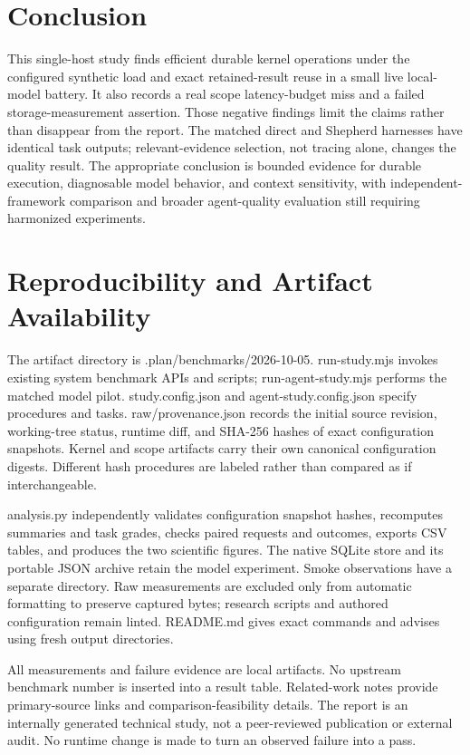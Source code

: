 \documentclass[11pt,a4paper]{article}
\begin{document}
\section{Conclusion}

This single-host study finds efficient durable kernel operations under the configured synthetic load and exact retained-result reuse in a small live local-model battery. It also records a real scope latency-budget miss and a failed storage-measurement assertion. Those negative findings limit the claims rather than disappear from the report. The matched direct and Shepherd harnesses have identical task outputs; relevant-evidence selection, not tracing alone, changes the quality result. The appropriate conclusion is bounded evidence for durable execution, diagnosable model behavior, and context sensitivity, with independent-framework comparison and broader agent-quality evaluation still requiring harmonized experiments.


\section{Reproducibility and Artifact Availability}

The artifact directory is .plan/benchmarks/2026-10-05. run-study.mjs invokes existing system benchmark APIs and scripts; run-agent-study.mjs performs the matched model pilot. study.config.json and agent-study.config.json specify procedures and tasks. raw/provenance.json records the initial source revision, working-tree status, runtime diff, and SHA-256 hashes of exact configuration snapshots. Kernel and scope artifacts carry their own canonical configuration digests. Different hash procedures are labeled rather than compared as if interchangeable.


analysis.py independently validates configuration snapshot hashes, recomputes summaries and task grades, checks paired requests and outcomes, exports CSV tables, and produces the two scientific figures. The native SQLite store and its portable JSON archive retain the model experiment. Smoke observations have a separate directory. Raw measurements are excluded only from automatic formatting to preserve captured bytes; research scripts and authored configuration remain linted. README.md gives exact commands and advises using fresh output directories.


All measurements and failure evidence are local artifacts. No upstream benchmark number is inserted into a result table. Related-work notes provide primary-source links and comparison-feasibility details. The report is an internally generated technical study, not a peer-reviewed publication or external audit. No runtime change is made to turn an observed failure into a pass.
\end{document}
